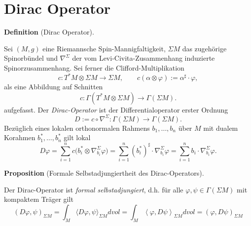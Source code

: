 \documentclass[10pt, letterpaper]{article}
\newcommand{\CustomHeading}[3]{%
  \par\medskip\noindent%
  \textbf{#1 #2} \textnormal{(#3)}.\enskip%
}
\newenvironment{DEF}[2]{\CustomHeading{Definition}{#1}{#2}}{}
\newenvironment{PROP}[2]{\CustomHeading{Proposition}{#1}{#2}}{}
\begin{document}
\section{Dirac Operator}


\begin{DEF}{}{Dirac Operator}
Sei $(M,g)$ eine Riemannsche Spin-Mannigfaltigkeit, $\Sigma M$ das zugehörige
Spinorbündel und $\nabla^\Sigma$ der vom Levi-Civita-Zusammenhang induzierte
Spinorzusammenhang. Sei ferner die Clifford-Multiplikation
\[
c:T^*M\otimes \Sigma M\to \Sigma M,\qquad c(\alpha\otimes \varphi):=\alpha^\sharp\cdot\varphi,
\]
als eine Abbildung auf Schnitten
\[
c:\Gamma(T^*M\otimes \Sigma M)\to \Gamma(\Sigma M).
\]
aufgefasst. Der \emph{Dirac-Operator} ist der Differentialoperator erster Ordnung
\[
D:=c\circ \nabla^\Sigma:\Gamma(\Sigma M)\to \Gamma(\Sigma M).
\]
Bezüglich eines lokalen orthonormalen Rahmens $b_1,\dots,b_n$ über $M$ mit dualem
Korahmen $b_1^*,\dots,b_n^*$ gilt lokal
\[
D\varphi
=
\sum_{i=1}^n c\bigl(b_i^*\otimes \nabla^\Sigma_{b_i}\varphi\bigr)
=
\sum_{i=1}^n (b_i^*)^\sharp\cdot \nabla^\Sigma_{b_i}\varphi
=
\sum_{i=1}^n b_i\cdot \nabla^\Sigma_{b_i}\varphi.
\]
\end{DEF}


\begin{PROP}{}{Formale Selbstadjungiertheit des Dirac-Operators} 
  Der Dirac-Operator ist \emph{formal selbstadjungiert}, d.h. für alle $\varphi,\psi \in \Gamma(\Sigma M)$ mit kompaktem Träger gilt
  $$
  (D\varphi,\psi)_{\Sigma M}=\int_M\langle D \varphi, \psi\rangle_{\Sigma M} dvol = \int_M\left\langle \varphi, D \psi\right\rangle_{\Sigma M} dvol= (\varphi,D\psi)_{\Sigma M}
  $$
\end{PROP}
\end{document}

